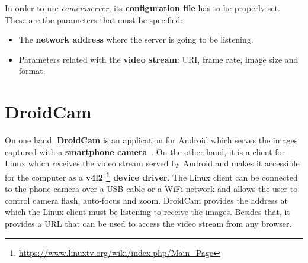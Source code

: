 In order to use \textit{cameraserver}, its \textbf{configuration file} has to be properly set. These are the parameters that must be specified:
\begin{itemize}
	\item The \textbf{network address} where the server is going to be listening.
	
	\item Parameters related with the \textbf{video stream}: URI, frame rate, image size and format.
\end{itemize}

\section{DroidCam}\label{sec:droidcam}
On one hand, \textbf{DroidCam} is an application for Android which serves the images captured with a \textbf{smartphone camera}~\cite{droidcam}. On the other hand, it is a client for Linux which receives the video stream served by Android and makes it accessible for the computer as a \textbf{v4l2 \footnote{\url{https://www.linuxtv.org/wiki/index.php/Main_Page}} device driver}. The Linux client can be connected to the phone camera over a USB cable or a WiFi network and allows the user to control camera flash, auto-focus and zoom. DroidCam provides the address at which the Linux client must be listening to receive the images. Besides that, it provides a URL that can be used to access the video stream from any browser. 


